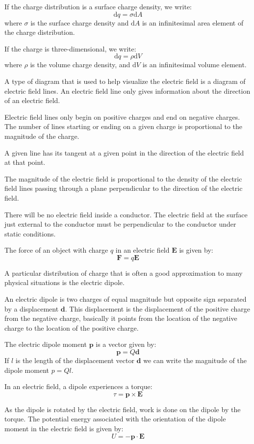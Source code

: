 \documentclass[../introphysics.tex]{subfiles}
\begin{document}
If the charge distribution is a surface charge density, we write:
\[\mathrm{d}q=\sigma\mathrm{d}A\]
where $\sigma$ is the surface charge density and $\mathrm{d}A$ is an infinitesimal area element of the charge distribution.

If the charge is three-dimensional, we write:
\[\mathrm{d}q=\rho\mathrm{d}V\]
where $\rho$ is the volume charge density, and $\mathrm{d}V$ is an infinitesimal volume element.

A type of diagram that is used to help visualize the electric field is a 
diagram of electric field lines. An electric field line only gives information 
about the direction of an electric field.

Electric field lines only begin on positive charges and end on negative charges. 
The number of lines starting or ending on a given charge is proportional to the magnitude of the charge.

A given line has its tangent at a given point in the direction of the electric field at that point.

The magnitude of the electric field is proportional to the density of the electric 
field lines passing through a plane perpendicular to the direction of the electric field.

There will be no electric field inside a conductor. The electric field at the 
surface just external to the conductor must be perpendicular to the conductor under static conditions.

The force of an object with charge $q$ in an electric field $\textbf{E}$ is given by:
\[\textbf{F}=q\textbf{E}\]

A particular distribution of charge that is often a good approximation to many physical situations is the electric dipole.

An electric dipole is two charges of equal magnitude but opposite sign separated by a 
displacement $\textbf{d}$. This displacement is the displacement of the positive charge 
from the negative charge, basically it points from the location of the negative charge to 
the location of the positive charge.

The electric dipole moment $\textbf{p}$ is a vector given by:
\[\textbf{p}=Q\textbf{d}\]
If $l$ is the length of the displacement vector $\textbf{d}$ we can write the magnitude of the dipole moment $p=Ql$.

In an electric field, a dipole experiences a torque:
\[\tau=\textbf{p}\times\textbf{E}\]

As the dipole is rotated by the electric field, work is done on the dipole by the torque. 
The potential energy associated with the orientation of the dipole moment in the electric field is given by:
\[U=-\textbf{p}\cdot\textbf{E}\]
\end{document}
